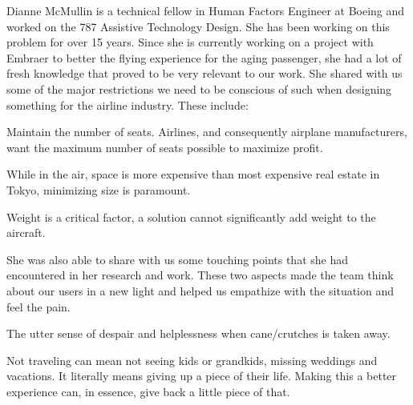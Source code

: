 Dianne McMullin is a technical fellow in Human Factors Engineer at Boeing and worked on the 787 Assistive Technology Design.  She has been working on this problem for over 15 years.  Since she is currently working on a project with Embraer to better the flying experience for the aging passenger, she had a lot of fresh knowledge that proved to be very relevant to our work. She shared with us some of the major restrictions we need to be conscious of such when designing something for the airline industry. These include:	
\begin{list}{-}{}
  \item Maintain the number of seats. Airlines, and consequently airplane manufacturers, want the maximum number of seats possible to maximize profit.
  \item While in the air, space is more expensive than most expensive real estate in Tokyo, minimizing size is paramount.
  \item Weight is a critical factor, a solution cannot significantly add weight to the aircraft.
\end{list}

She was also able to share with us some touching points that she had encountered in her research and work.  These two aspects made the team think about our users in a new light and helped us empathize with the situation and feel the pain.  

\begin{list}{-}{}
  \item The utter sense of despair and helplessness when cane/crutches is taken away.
  \item Not traveling can mean not seeing kids or grandkids, missing weddings and vacations. It literally means giving up a piece of their life. Making this a better experience can, in essence, give back a little piece of that.
\end{list}


